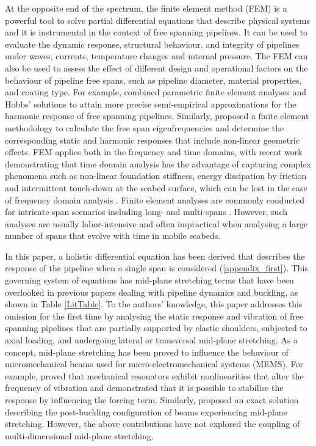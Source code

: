 \documentclass[3p,doublespacing,authoryear,11pt]{elsarticle} %
\begin{document}
At the opposite end of the spectrum, the finite element method (FEM) is a powerful tool to solve partial differential equations that describe physical systems \citep{Zienkiewicz,Hughes} and it is instrumental in the context of free spanning pipelines. It can be used to evaluate the dynamic response, structural behaviour, and integrity of pipelines under waves, currents, temperature changes and internal pressure. The FEM can also be used to assess the effect of different design and operational factors on the behaviour of pipeline free spans, such as pipeline diameter, material properties, and coating type. For example, \cite{Fyrileiv:2002vh} combined parametric finite element analyses and Hobbs' solutions to attain more precise semi-empirical approximations for the harmonic response of free spanning pipelines. Similarly, \cite{Vedeld:2013wi} proposed a finite element methodology to calculate the free span eigenfrequencies and determine the corresponding static and harmonic responses that include non-linear geometric effects. FEM applies both in the frequency and time domains, with recent work demonstrating that time domain analysis has the advantage of capturing complex phenomena such as non-linear foundation stiffness, energy dissipation by friction and intermittent touch-down at the seabed surface, which can be lost in the case of frequency domain analysis \citep{Roberts2014}.  Finite element analyses are commonly conducted for intricate span scenarios including long- and multi-spans \citep{Kristiansen:1998tk,Wang:2009ui}. However, such analyses are usually labor-intensive and often impractical when analysing a large number of spans that evolve with time in mobile seabeds.

In this paper, a holistic differential equation has been derived that describes the response of the pipeline when a single span is considered (\ref{appendix_first}). This governing system of equations has mid-plane stretching terms that have been overlooked in previous papers dealing with pipeline dynamics and buckling, as shown in Table \ref{LitTable}. To the authors' knowledge, this paper addresses this omission for the first time by analysing the static response and vibration of free spanning pipelines that are partially supported by elastic shoulders, subjected to axial loading, and undergoing lateral or transversal mid-plane stretching. As a concept, mid-plane stretching has been proved to influence the behaviour of micromechanical beams \citep{Antonio:2012tm,Nayfeh:2008vk} used for micro-electromechanical systems (MEMS). For example, 
\cite{Antonio:2012tm} proved that mechanical resonators exhibit nonlinearities that alter the frequency of vibration and demonstrated that it is possible to stabilise the response by influencing the forcing term. Similarly, \cite{Nayfeh:2008vk} proposed an exact solution describing the post-buckling configuration of beams experiencing mid-plane stretching. However, the above contributions have not explored the coupling of multi-dimensional mid-plane stretching.  
\end{document}
